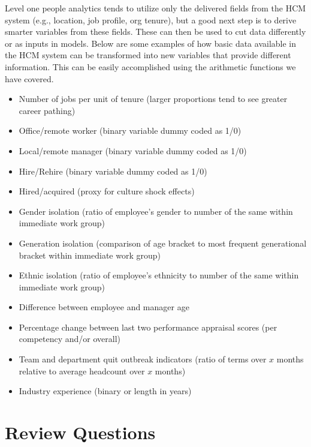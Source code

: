 \documentclass[
]{book}
\providecommand{\tightlist}{%
  \setlength{\itemsep}{0pt}\setlength{\parskip}{0pt}}
\begin{document}
Level one people analytics tends to utilize only the delivered fields from the HCM system (e.g., location, job profile, org tenure), but a good next step is to derive smarter variables from these fields. These can then be used to cut data differently or as inputs in models. Below are some examples of how basic data available in the HCM system can be transformed into new variables that provide different information. This can be easily accomplished using the arithmetic functions we have covered.

\begin{itemize}
\tightlist
\item
  Number of jobs per unit of tenure (larger proportions tend to see greater career pathing)
\item
  Office/remote worker (binary variable dummy coded as 1/0)
\item
  Local/remote manager (binary variable dummy coded as 1/0)
\item
  Hire/Rehire (binary variable dummy coded as 1/0)
\item
  Hired/acquired (proxy for culture shock effects)
\item
  Gender isolation (ratio of employee's gender to number of the same within immediate work
  group)
\item
  Generation isolation (comparison of age bracket to most frequent generational bracket within
  immediate work group)
\item
  Ethnic isolation (ratio of employee's ethnicity to number of the same within immediate work
  group)
\item
  Difference between employee and manager age
\item
  Percentage change between last two performance appraisal scores (per competency and/or
  overall)
\item
  Team and department quit outbreak indicators (ratio of terms over \(x\) months relative to average
  headcount over \(x\) months)
\item
  Industry experience (binary or length in years)
\end{itemize}

\hypertarget{review-questions-4}{%
\section{Review Questions}\label{review-questions-4}}
\end{document}
